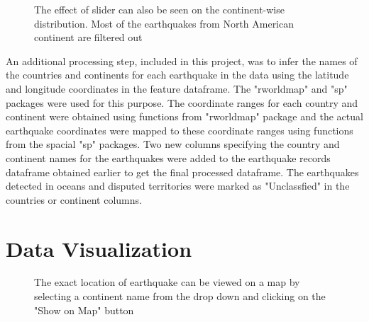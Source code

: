 \documentclass{article}
\begin{document}
		\begin{figure}
			\caption{The effect of slider can also be seen on the continent-wise distribution. Most of the earthquakes from North American continent are filtered out}
		\end{figure}
		
		An additional processing step, included in this project, was to infer the names of the countries and continents for each earthquake in the data using the latitude and longitude coordinates in the feature dataframe. The "rworldmap" and "sp" packages were used for this purpose. The coordinate ranges for each country and continent were obtained using functions from "rworldmap" package and the actual earthquake coordinates were mapped to these coordinate ranges using functions from the spacial "sp" packages. Two new columns specifying the country and continent names for the earthquakes were added to the earthquake records dataframe obtained earlier to get the final processed dataframe. The earthquakes detected in oceans and disputed territories were marked as "Unclassfied" in the countries or continent columns.
		
	\section{Data Visualization}
		
		\begin{figure}
			\caption{The exact location of earthquake can be viewed on a map by selecting a continent name from the drop down and clicking on the "Show on Map" button}
		\end{figure}
		
\end{document}
